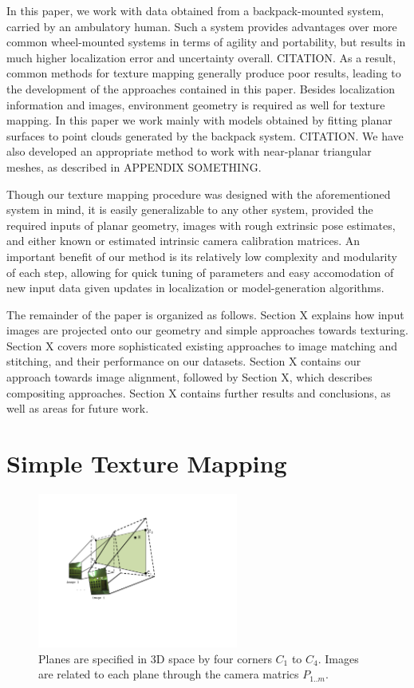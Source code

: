 \documentclass[]{spie}  %
\begin{document}
In this paper, we work with data obtained from a backpack-mounted
system, carried by an ambulatory human. Such a system provides
advantages over more common wheel-mounted systems in terms of agility
and portability, but results in much higher localization error and
uncertainty overall. CITATION. As a result, common methods for texture
mapping generally produce poor results, leading to the development of
the approaches contained in this paper. Besides localization
information and images, environment geometry is required as well for
texture mapping. In this paper we work mainly with models obtained by
fitting planar surfaces to point clouds generated by the backpack
system. CITATION. We have also developed an appropriate method to work
with near-planar triangular meshes, as described in APPENDIX
SOMETHING.

Though our texture mapping procedure was designed with the
aforementioned system in mind, it is easily generalizable to any other
system, provided the required inputs of planar geometry, images with
rough extrinsic pose estimates, and either known or estimated
intrinsic camera calibration matrices. An important benefit of our
method is its relatively low complexity and modularity of each step,
allowing for quick tuning of parameters and easy accomodation of new
input data given updates in localization or model-generation
algorithms.

The remainder of the paper is organized as follows. Section X explains
how input images are projected onto our geometry and simple approaches
towards texturing. Section X covers more sophisticated existing
approaches to image matching and stitching, and their performance on
our datasets. Section X contains our approach towards image alignment,
followed by Section X, which describes compositing approaches. Section
X contains further results and conclusions, as well as areas for
future work.

\section{Simple Texture Mapping}
\label{sec:simpleTextureMapping}
\begin{figure}
  \centering
  \includegraphics[height=2in]{Projection.pdf}
  \caption{Planes are specified in 3D space by four corners $C_1$ to
    $C_4$. Images are related to each plane through the camera matrics
    $P_{1..m}$. }
  \label{fig:projection}
\end{figure}
\end{document}
